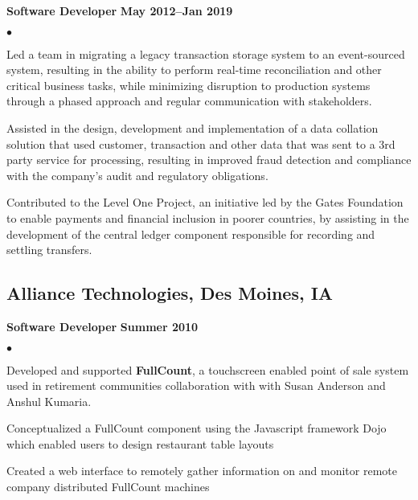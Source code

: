 \documentclass[10pt,letterpaper]{article}
\renewenvironment{itemize}{
  \begin{list}{}{
      \setlength{\leftmargin}{1.5em}
      \setlength{\itemsep}{0.25em}
      \setlength{\parskip}{0pt}
      \setlength{\parsep}{0.25em}
    }
  }{
  \end{list}
}
\newenvironment{bitemize}{
  \begin{list}{\(\bullet \)}{
      \setlength{\leftmargin}{1.5em}
      \setlength{\itemsep}{0.25em}
      \setlength{\parskip}{0pt}
      \setlength{\parsep}{0.25em}
    }
  }{
  \end{list}
}
\newcommand{\yearrange}[1]{\hfill \textbf{#1} \par}
\begin{document}
\begin{itemize}
  \item \textbf{Software Developer} \yearrange{May 2012--Jan 2019}
        \begin{bitemize}
          \item Led a team in migrating a legacy transaction storage system to an
          event-sourced system, resulting in the ability to perform real-time
          reconciliation and other critical business tasks, while minimizing
          disruption to production systems through a phased approach and regular
          communication with stakeholders.
          \item Assisted in the design, development and implementation of a data
          collation solution that used customer, transaction and other data that was
          sent to a 3rd party service for processing, resulting in improved fraud
          detection and compliance with the company's audit and regulatory
          obligations.
          \item Contributed to the Level One Project, an initiative led by the Gates
          Foundation to enable payments and financial inclusion in poorer countries,
          by assisting in the development of the central ledger component
          responsible for recording and settling transfers.
        \end{bitemize}
\end{itemize}

\subsection*{Alliance Technologies, Des Moines, IA}

\begin{itemize}
  \item \textbf{Software Developer} \yearrange{Summer 2010}
        \begin{bitemize}
          \item Developed and supported \textbf{FullCount}, a touchscreen enabled
          point of sale system used in retirement communities %
          collaboration with with Susan Anderson and Anshul Kumaria.
          \item Conceptualized a FullCount component using the Javascript framework
          Dojo which enabled users to design restaurant table layouts
          \item Created a web interface to remotely gather information on and monitor
          remote company distributed FullCount machines
        \end{bitemize}
\end{itemize}
\end{document}
